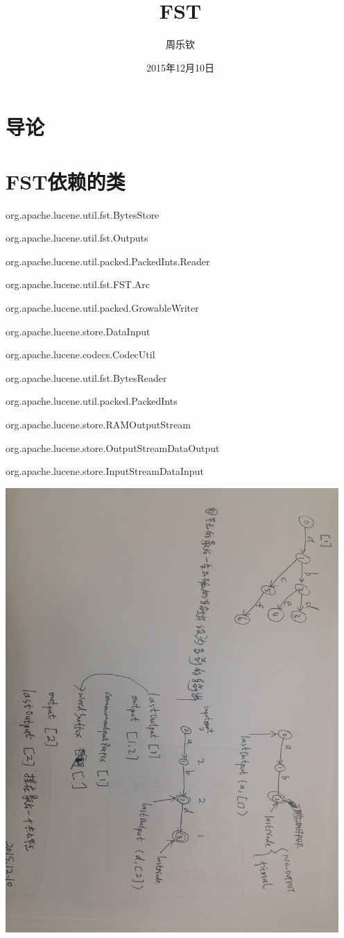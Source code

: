 \documentclass{article}
\begin{document}
\title{FST}
\author{周乐钦}
\date{2015年12月10日}
\maketitle	

\section{导论}


\section{FST依赖的类}
org.apache.lucene.util.fst.BytesStore

org.apache.lucene.util.fst.Outputs

org.apache.lucene.util.packed.PackedInts.Reader

org.apache.lucene.util.fst.FST.Arc

org.apache.lucene.util.packed.GrowableWriter

org.apache.lucene.store.DataInput

org.apache.lucene.codecs.CodecUtil

org.apache.lucene.util.fst.BytesReader

org.apache.lucene.util.packed.PackedInts

org.apache.lucene.store.RAMOutputStream

org.apache.lucene.store.OutputStreamDataOutput

org.apache.lucene.store.InputStreamDataInput

\begin{center}
    \includegraphics[width=360pt]{IMG_2809.JPG}
\end{center}
\end{document}
